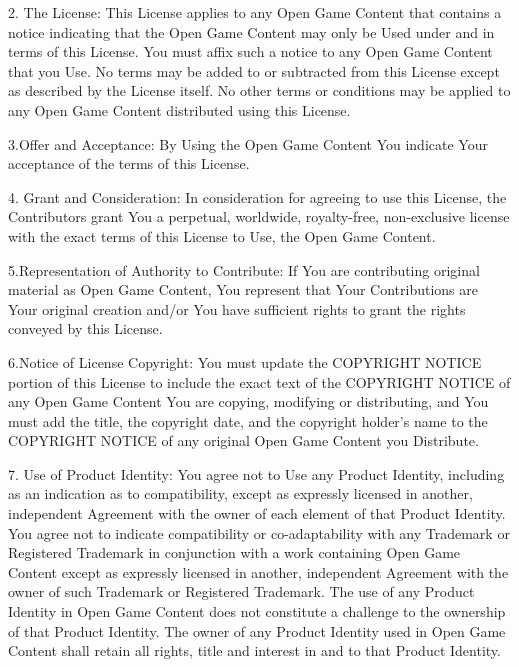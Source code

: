 \documentclass{article}
\begin{document}
\vspace{12pt}
2. The License: This License applies to any Open Game Content that contains a notice 
indicating that the Open Game Content may only be Used under and in terms of this 
License. You must affix such a notice to any Open Game Content that you Use. No 
terms may be added to or subtracted from this License except as described by the 
License itself. No other terms or conditions may be applied to any Open Game Content 
distributed using this License. 

\vspace{12pt}
3.Offer and Acceptance: By Using the Open Game Content You indicate Your acceptance 
of the terms of this License. 

\vspace{12pt}
4. Grant and Consideration: In consideration for agreeing to use this License, 
the Contributors grant You a perpetual, worldwide, royalty-free, non-exclusive 
license with the exact terms of this License to Use, the Open Game Content. 

\vspace{12pt}
5.Representation of Authority to Contribute: If You are contributing original material 
as Open Game Content, You represent that Your Contributions are Your original creation 
and/or You have sufficient rights to grant the rights conveyed by this License. 

\vspace{12pt}
6.Notice of License Copyright: You must update the COPYRIGHT NOTICE portion of 
this License to include the exact text of the COPYRIGHT NOTICE of any Open Game 
Content You are copying, modifying or distributing, and You must add the title, 
the copyright date, and the copyright holder's name to the COPYRIGHT NOTICE of 
any original Open Game Content you Distribute. 

\vspace{12pt}
7. Use of Product Identity: You agree not to Use any Product Identity, including 
as an indication as to compatibility, except as expressly licensed in another, 
independent Agreement with the owner of each element of that Product Identity. 
You agree not to indicate compatibility or co-adaptability with any Trademark or 
Registered Trademark in conjunction with a work containing Open Game Content except 
as expressly licensed in another, independent Agreement with the owner of such 
Trademark or Registered Trademark. The use of any Product Identity in Open Game 
Content does not constitute a challenge to the ownership of that Product Identity. 
The owner of any Product Identity used in Open Game Content shall retain all rights, 
title and interest in and to that Product Identity. 
\end{document}
